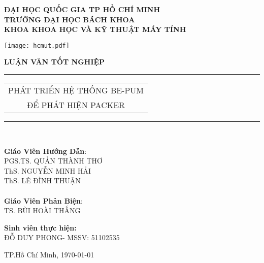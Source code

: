 \begin{titlepage}


\vspace{-1cm}

\thispagestyle{empty}
\begin{center}
	\bfseries ĐẠI HỌC QUỐC GIA TP HỒ CHÍ MINH \\
	TRƯỜNG ĐẠI HỌC BÁCH KHOA \\
	KHOA KHOA HỌC VÀ KỸ THUẬT MÁY TÍNH\\
\end{center}

\vspace{0.5cm}

\begin{center}
\texttt{[image: hcmut.pdf]}\\[1cm]
\end{center}

\begin{center}
	\Large \bfseries LUẬN VĂN TỐT NGHIỆP \\[0.5cm]
\end{center}
\rule{\textwidth}{1pt}
\begin{center}
\Huge
	\begin{tabular}{@{}c}
		PHÁT TRIỂN HỆ THỐNG BE-PUM \\ 
		ĐỂ PHÁT HIỆN PACKER \\ [6pt]
	\end{tabular}
\end{center}
\rule{\textwidth}{1pt}\\[1cm]

\hspace{-0.5cm}
\begin{minipage}[t]{0.44\linewidth}
	\textbf{Giáo Viên Hướng Dẫn}: \\
		PGS.TS. QUẢN THÀNH THƠ\\
		ThS. NGUYỄN MINH HẢI\\
		ThS. LÊ ĐÌNH THUẬN\\\\
	\textbf{Giáo Viên Phản Biện}: \\
		 TS. BÙI HOÀI THẮNG
	\end{minipage}
\begin{minipage}[t]{0.60\linewidth}
	\textbf{Sinh viên thực hiện:}\\
		ĐỖ DUY PHONG- MSSV: 51102535
\end{minipage}

\vspace{1.4cm}

\vfill
\begin{center}
	{TP.Hồ Chí Minh, \today}
\end{center}
\end{titlepage}
